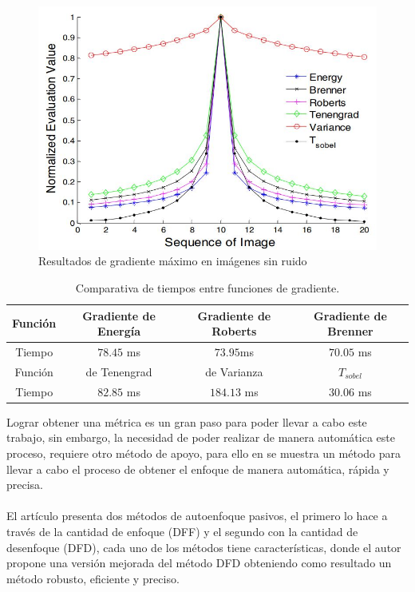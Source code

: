 \begin{figure}
\centering
\includegraphics[width=\textwidth]{GraficosEdArt/FocusingWithoutNoise-mo2012.JPG}
\caption{Resultados de gradiente máximo en imágenes sin ruido \citet{Mo2012}}
\label{FocusingWithoutNoise_mo2012}
\end{figure}

\begin{table}[t]
\begin{center}
\begin{tabular}{| c | c | c | c |}
\hline
Función & Gradiente de Energía & Gradiente de Roberts & Gradiente de Brenner\\ \hline
Tiempo & $78.45$ ms & $73.95$ms& $70.05$ ms \\\hline
Función &de Tenengrad & de Varianza & $T_{sobel}$ \\\hline
Tiempo & $82.85$ ms & $184.13$ ms& $30.06$ ms \\ \hline
\end{tabular}
\caption{Comparativa de tiempos entre funciones de gradiente. \citet{Mo2012}}
\label{tab:gradMax}
\end{center}
\end{table} 

Lograr obtener una métrica es un gran paso para poder llevar a cabo este trabajo, sin embargo, la necesidad de poder realizar de manera automática este proceso, requiere otro método de apoyo, para ello en \citet{Zhang:14}  se muestra un método para llevar a cabo el proceso de obtener el enfoque de manera automática, rápida y precisa. \\
\\
El artículo presenta dos métodos de autoenfoque pasivos, el primero lo hace a través de la cantidad de enfoque (DFF) y el segundo con la cantidad de desenfoque (DFD), cada uno de los métodos tiene características, donde el autor propone una versión mejorada del método DFD obteniendo como resultado un método robusto, eficiente y preciso.

